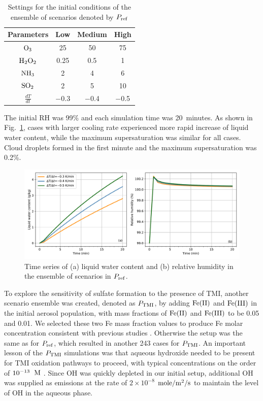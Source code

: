 \documentclass[edeposit,fullpage]{uiucthesis2009}
\makeatletter
\DeclareRobustCommand*\unit[1]
 {\ensuremath{%
   {\thinmuskip3mu\relax
    \def\mu{\text{\textmu}}\def~{\,}%
    \ifx\f@series\testbx\mathbf{#1}\else\mathrm{#1}\fi}}}
\makeatother
\begin{document}
\begin{table}[ht]
\centering
\caption{Settings for the initial conditions of the ensemble of
  scenarios denoted by $P_{\rm ref}$}
\label{TMI-setting}
\begin{tabular}{c  c c  c}
\hline
Parameters & Low  & Medium & High\\
\hline
$\rm O_3$& 25 & 50 & 75 \\
$\rm H_2O_2$& 0.25 & 0.5 &  1\\
$\rm NH_3$ &2 & 4 & 6 \\
$\rm SO_2$&2&5& 10\\
$\frac{dT}{dt}$ &$-$0.3 &$ -$0.4&$-$0.5\\
\hline
\end{tabular}
\end{table}

The initial RH was 99\% and each simulation time was 20~minutes. As
shown in Fig.~\ref{chap2:ensemrh}, cases with larger cooling rate
experienced more rapid increase of liquid water content, while the
maximum supersaturation was similar for all cases. Cloud droplets
formed in the first minute and the maximum supersaturation was 0.2\%.

\begin{figure}[ht]
    \centering \includegraphics[scale=0.55]{chap2_figs/chap2_mono_lwc_rh.pdf}
    \caption{Time series of (a) liquid water content and (b) relative
      humidity in the ensemble of scenarios in $P_{\rm ref}$.}
    \label{chap2:ensemrh}
\end{figure}

To explore the sensitivity of sulfate formation to the presence of
TMI, another scenario ensemble was created, denoted as $P_{\rm TMI}$,
by adding $\rm Fe(II)$ and $\rm Fe(III)$ in the initial aerosol
population, with mass fractions of $\rm Fe(II)$ and $\rm Fe(III)$ to
be 0.05 and 0.01. We selected these two Fe mass fraction values to
produce Fe molar concentration consistent with previous studies
\citep{Deguillaume2005}.  Otherwise the setup was the same as for
$P_{\rm ref}$, which resulted in another 243 cases for $P_{\rm
  TMI}$. An important lesson of the $P_{\rm TMI}$ simulations was that
aqueous hydroxide needed to be present for TMI oxidation pathways to
proceed, with typical concentrations on the order of $\rm
10^{-13}$~\unit{M} \citep{deguillaume2004role}. Since OH was quickly
depleted in our initial setup, additional OH was supplied as emissions
at the rate of $2\times 10^{-8}$ \unit{mole/m^2/s} to maintain the
level of OH in the aqueous phase.
\end{document}

